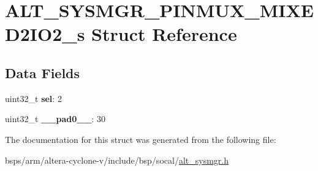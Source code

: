 \hypertarget{structALT__SYSMGR__PINMUX__MIXED2IO2__s}{}\section{A\+L\+T\+\_\+\+S\+Y\+S\+M\+G\+R\+\_\+\+P\+I\+N\+M\+U\+X\+\_\+\+M\+I\+X\+E\+D2\+I\+O2\+\_\+s Struct Reference}
\label{structALT__SYSMGR__PINMUX__MIXED2IO2__s}
\subsection*{Data Fields}
\begin{DoxyCompactItemize}
\item 
\mbox{\label{structALT__SYSMGR__PINMUX__MIXED2IO2__s_ad6861969a2638067b8aba65123bf7509}} 
uint32\+\_\+t {\bfseries sel}\+: 2
\item 
\mbox{\label{structALT__SYSMGR__PINMUX__MIXED2IO2__s_af15e7923f1e84981ec1b5f7071d64b0a}} 
uint32\+\_\+t {\bfseries \+\_\+\+\_\+pad0\+\_\+\+\_\+}\+: 30
\end{DoxyCompactItemize}


The documentation for this struct was generated from the following file\+:\begin{DoxyCompactItemize}
\item 
bsps/arm/altera-\/cyclone-\/v/include/bsp/socal/\mbox{\hyperlink{alt__sysmgr_8h}{alt\+\_\+sysmgr.\+h}}\end{DoxyCompactItemize}
